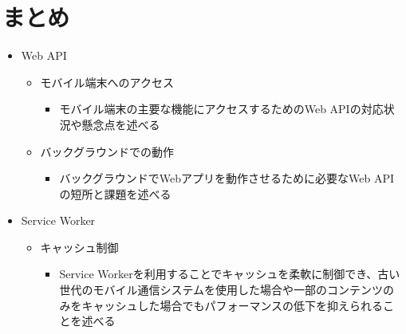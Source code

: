\section{まとめ}\label{section:まとめ}
\begin{itemize}
  \item Web API
  \begin{itemize}
    \item モバイル端末へのアクセス
    \begin{itemize}
      \item モバイル端末の主要な機能にアクセスするためのWeb APIの対応状況や懸念点を述べる
    \end{itemize}
    \item バックグラウンドでの動作
    \begin{itemize}
      \item バックグラウンドでWebアプリを動作させるために必要なWeb APIの短所と課題を述べる
    \end{itemize}
  \end{itemize}
  \item Service Worker
  \begin{itemize}
    \item キャッシュ制御
    \begin{itemize}
      \item Service Workerを利用することでキャッシュを柔軟に制御でき、古い世代のモバイル通信システムを使用した場合や一部のコンテンツのみをキャッシュした場合でもパフォーマンスの低下を抑えられることを述べる
    \end{itemize}
  \end{itemize}
\end{itemize}
